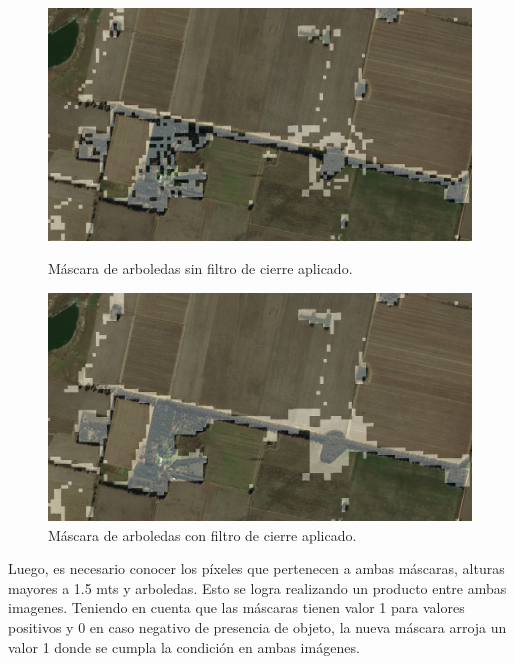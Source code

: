 \documentclass[10pt,a4paper, twoside]{report}
\begin{document}
\begin{figure}[H]
   \begin{minipage}{0.48\textwidth}
     \centering
     \includegraphics[width=1.0\linewidth]{imagenes/MascaraArbolesSinFiltro}
     \caption{Máscara de arboledas sin filtro de cierre aplicado.}\label{sinFiltroCierre}
   \end{minipage}\hfill
   \begin {minipage}{0.48\textwidth}
     \centering
     \includegraphics[width=1.0\linewidth]{imagenes/MascaraArbolesConFiltro}
     \caption{Máscara de arboledas con filtro de cierre aplicado.}\label{conFiltroCierre}
   \end{minipage}
\end{figure}

Luego, es necesario conocer los píxeles que pertenecen a ambas máscaras, alturas mayores a 1.5 mts y arboledas. Esto se logra realizando un producto entre ambas imagenes. Teniendo en cuenta que las máscaras tienen valor 1 para valores positivos y 0 en caso negativo de presencia de objeto, la nueva máscara arroja un valor 1 donde se cumpla la condición en ambas imágenes.
\end{document}
